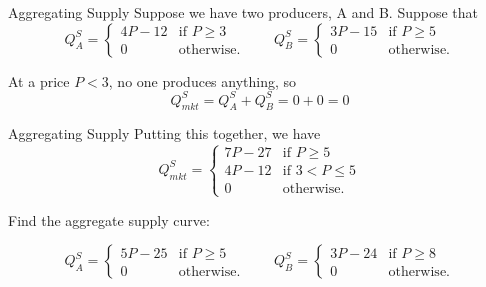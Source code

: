 \documentclass[12pt,t]{beamer}
\begin{document}
\begin{frame}{Aggregating Supply}
  Suppose we have two producers, A and B. Suppose that
  $$
    Q_A^S =
    \begin{cases}
      4P - 12 & \text{if } P \geq 3 \\
      0       & \text{otherwise}.
    \end{cases} 
    \quad\quad
    Q_B^S =
    \begin{cases}
      3P - 15 & \text{if } P  \geq 5 \\
      0       & \text{otherwise}.
    \end{cases}
  $$

  \vspace{10mm}


   {
    At a price $P < 3$, no one produces anything, so 
    $$Q_{mkt}^S = Q_A^S + Q_B^S = 0 + 0 = 0$$ 
  }
\end{frame}

\begin{frame}{Aggregating Supply}
  Putting this together, we have 
  $$
    Q_{mkt}^S =
    \begin{cases}
      7P - 27 & \text{if } P \geq 5     \\
      4P - 12 & \text{if } 3 < P \leq 5 \\
      0       & \text{otherwise}.
    \end{cases}
  $$
\end{frame}

\begin{frame}

  \bigskip
  Find the aggregate supply curve:

  $$
    Q_A^S =
    \begin{cases}
      5P - 25 & \text{if } P \geq 5 \\
      0       & \text{otherwise}.
    \end{cases}
    \quad\quad
    Q_B^S =
    \begin{cases}
      3P - 24 & \text{if } P  \geq 8 \\
      0       & \text{otherwise}.
    \end{cases}
  $$
\end{frame}
\end{document}
